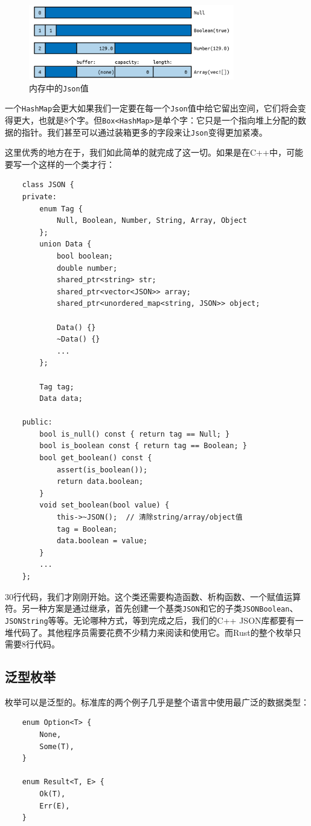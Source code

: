 \begin{figure}[htbp]
    \centering
    \includegraphics[width=0.8\textwidth]{../img/f10-2.png}
    \caption{内存中的\texttt{Json}值}
    \label{f10-2}
\end{figure}

一个\texttt{HashMap}会更大如果我们一定要在每一个\texttt{Json}值中给它留出空间，它们将会变得更大，也就是8个字。但\texttt{Box<HashMap>}是单个字：它只是一个指向堆上分配的数据的指针。我们甚至可以通过装箱更多的字段来让\texttt{Json}变得更加紧凑。

这里优秀的地方在于，我们如此简单的就完成了这一切。如果是在C++中，可能要写一个这样的一个类才行：
\begin{verbatim}
    class JSON {
    private:
        enum Tag {
            Null, Boolean, Number, String, Array, Object
        };
        union Data {
            bool boolean;
            double number;
            shared_ptr<string> str;
            shared_ptr<vector<JSON>> array;
            shared_ptr<unordered_map<string, JSON>> object;

            Data() {}
            ~Data() {}
            ...
        };
        
        Tag tag;
        Data data;
    
    public:
        bool is_null() const { return tag == Null; }
        bool is_boolean const { return tag == Boolean; }
        bool get_boolean() const {
            assert(is_boolean());
            return data.boolean;
        }
        void set_boolean(bool value) {
            this->~JSON();  // 清除string/array/object值
            tag = Boolean;
            data.boolean = value;
        }
        ...
    };
\end{verbatim}

30行代码，我们才刚刚开始。这个类还需要构造函数、析构函数、一个赋值运算符。另一种方案是通过继承，首先创建一个基类\texttt{JSON}和它的子类\texttt{JSONBoolean}、\texttt{JSONString}等等。无论哪种方式，等到完成之后，我们的C++ JSON库都要有一堆代码了。其他程序员需要花费不少精力来阅读和使用它。而Rust的整个枚举只需要8行代码。

\subsection{泛型枚举}
枚举可以是泛型的。标准库的两个例子几乎是整个语言中使用最广泛的数据类型：
\begin{verbatim}
    enum Option<T> {
        None,
        Some(T),
    }

    enum Result<T, E> {
        Ok(T),
        Err(E),
    }
\end{verbatim}


